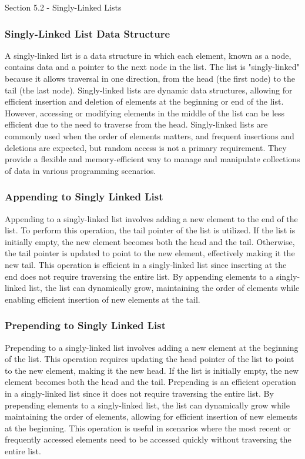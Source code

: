 \begin{notes}{Section 5.2 - Singly-Linked Lists}
    \subsubsection*{Singly-Linked List Data Structure}

    A singly-linked list is a data structure in which each element, known as a node, contains data and a pointer to the next node in the list. The list is "singly-linked" because it allows traversal in one direction, from the head (the first node) to the tail (the last node). 
    Singly-linked lists are dynamic data structures, allowing for efficient insertion and deletion of elements at the beginning or end of the list. However, accessing or modifying elements in the middle of the list can be less efficient due to the need to traverse from the head. 
    Singly-linked lists are commonly used when the order of elements matters, and frequent insertions and deletions are expected, but random access is not a primary requirement. They provide a flexible and memory-efficient way to manage and manipulate collections of data in various 
    programming scenarios.
    
    \subsubsection*{Appending to Singly Linked List}
    
    Appending to a singly-linked list involves adding a new element to the end of the list. To perform this operation, the tail pointer of the list is utilized. If the list is initially empty, the new element becomes both the head and the tail. Otherwise, the tail pointer is updated 
    to point to the new element, effectively making it the new tail. This operation is efficient in a singly-linked list since inserting at the end does not require traversing the entire list. By appending elements to a singly-linked list, the list can dynamically grow, maintaining 
    the order of elements while enabling efficient insertion of new elements at the tail.
    
    \subsubsection*{Prepending to Singly Linked List}
    
    Prepending to a singly-linked list involves adding a new element at the beginning of the list. This operation requires updating the head pointer of the list to point to the new element, making it the new head. If the list is initially empty, the new element becomes both the head 
    and the tail. Prepending is an efficient operation in a singly-linked list since it does not require traversing the entire list. By prepending elements to a singly-linked list, the list can dynamically grow while maintaining the order of elements, allowing for efficient insertion 
    of new elements at the beginning. This operation is useful in scenarios where the most recent or frequently accessed elements need to be accessed quickly without traversing the entire list.
    

\end{notes}
